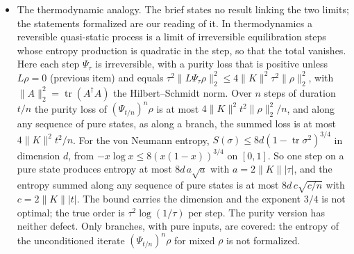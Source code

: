 \documentclass[11pt]{article}
\begin{document}
\begin{itemize}
  so the purity strictly decreases unless $L\rho = 0$, and a pure state has purity one.
  ``Irreversible'' is read as ``not undone by a positive map'': $\Psi_\tau$ is a linear bijection
  with inverse $I - \tau L$, and $(I - \tau L)\ket{\psi}\bra{\psi}$ is not positive. For
  $u = K\psi - \braket{\psi|K\psi}\psi \ne 0$ and $v = \psi - i(\tau\|u\|^2)^{-1}u$ its
  expectation value in $v$ is $-1$. The proofs use neither the Cayley transform nor the spectral
  theorem. That reconstruction uses $(I + \tau L)^{-1}$, and that only the limit is unitary, is
  the reconstruction clause of DR-PROJ and Theorem~18 ().
\item The thermodynamic analogy. The brief states no result linking the two limits; the
  statements formalized are our reading of it. In thermodynamics a reversible quasi-static
  process is a limit of irreversible equilibration steps whose entropy production is quadratic in
  the step, so that the total vanishes. Here each step $\Psi_\tau$ is irreversible, with a purity
  loss that is positive unless $L\rho = 0$ (previous item) and equals
  $\tau^2\|L\Psi_\tau\rho\|_2^2 \le 4\|K\|^2\tau^2\|\rho\|_2^2$, with $\|A\|_2^2 =
  \operatorname{tr}(A^\dagger A)$ the Hilbert--Schmidt norm. Over $n$ steps of duration $t/n$ the
  purity loss of $(\Psi_{t/n})^n\rho$ is at most $4\|K\|^2t^2\|\rho\|_2^2/n$, and along any
  sequence of pure states, as along a branch, the summed loss is at most $4\|K\|^2t^2/n$. For the
  von Neumann entropy, $S(\sigma) \le 8d(1 - \operatorname{tr}\sigma^2)^{3/4}$ in dimension $d$,
  from $-x\log x \le 8(x(1-x))^{3/4}$ on $[0,1]$. So one step on a pure state produces entropy at
  most $8d\,a\sqrt a$ with $a = 2\|K\||\tau|$, and the entropy summed along any sequence of pure
  states is at most $8d\,c\sqrt{c/n}$ with $c = 2\|K\||t|$. The bound carries the dimension
  and the exponent $3/4$ is not optimal; the true order is $\tau^2\log(1/\tau)$ per step. The
  purity version has neither defect. Only branches, with pure inputs, are covered: the entropy of
  the unconditioned iterate $(\Psi_{t/n})^n\rho$ for mixed $\rho$ is not formalized.
\end{itemize}
\end{document}
